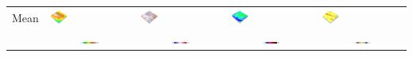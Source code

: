 \documentclass[prodmode,acmtochi]{acmsmall} %
\begin{document}
\begin{table}
{\begin{tabular}{m{} m{} m{} m{} m{}}
%
Mean & 
\includegraphics[width=0.22\textwidth]{images/render_3d/participants/mean_dem_4.png} &
\includegraphics[width=0.22\textwidth]{images/render_3d/participants/mean_dem_difference_4.png} &
\includegraphics[width=0.22\textwidth]{images/render_3d/participants/mean_slope_4.png} &
\includegraphics[width=0.22\textwidth]{images/render_3d/participants/mean_forms_4.png}\\
%
&
\multicolumn{1}{c}{\includegraphics[width=0.22\textwidth]{images/legends/elevation_legend_4.pdf}} &
\multicolumn{1}{c}{\includegraphics[width=0.22\textwidth]{images/legends/diff_legend.pdf}} &
\multicolumn{1}{c}{\includegraphics[width=0.22\textwidth]{images/legends/slope_legend.pdf}} &
\multicolumn{1}{c}{\includegraphics[width=0.22\textwidth]{images/legends/forms_legend.pdf}}\\
%
\bottomrule
\end{tabular}}
\label{table:difference_experiment} 

\end{table}
\end{document}
